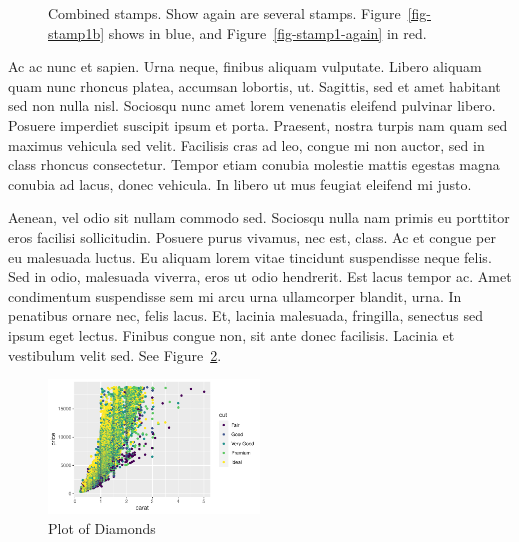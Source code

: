 \documentclass[
  9pt,
  letterpaper,
  DIV=11,
  numbers=noendperiod]{scrartcl}
\begin{document}
\begin{figure}
\begin{minipage}[t]{0.50\linewidth}
{{}

}

\end{minipage}%

\caption{\label{fig-combined}Combined stamps. Show again are several
stamps. Figure~\ref{fig-stamp1b} shows in blue, and
Figure~\ref{fig-stamp1-again} in red.}

\end{figure}

Ac ac nunc et sapien. Urna neque, finibus aliquam vulputate. Libero
aliquam quam nunc rhoncus platea, accumsan lobortis, ut. Sagittis, sed
et amet habitant sed non nulla nisl. Sociosqu nunc amet lorem venenatis
eleifend pulvinar libero. Posuere imperdiet suscipit ipsum et porta.
Praesent, nostra turpis nam quam sed maximus vehicula sed velit.
Facilisis cras ad leo, congue mi non auctor, sed in class rhoncus
consectetur. Tempor etiam conubia molestie mattis egestas magna conubia
ad lacus, donec vehicula. In libero ut mus feugiat eleifend mi justo.

\newpage{}

Aenean, vel odio sit nullam commodo sed. Sociosqu nulla nam primis eu
porttitor eros facilisi sollicitudin. Posuere purus vivamus, nec est,
class. Ac et congue per eu malesuada luctus. Eu aliquam lorem vitae
tincidunt suspendisse neque felis. Sed in odio, malesuada viverra, eros
ut odio hendrerit. Est lacus tempor ac. Amet condimentum suspendisse sem
mi arcu urna ullamcorper blandit, urna. In penatibus ornare nec, felis
lacus. Et, lacinia malesuada, fringilla, senectus sed ipsum eget lectus.
Finibus congue non, sit ante donec facilisis. Lacinia et vestibulum
velit sed. See Figure~\ref{fig-diamonds}.

\begin{figure}

{\centering \includegraphics[width=0.5\textwidth,height=\textheight]{man_files/figure-pdf/fig-diamonds-1.pdf}

}

\caption{\label{fig-diamonds}Plot of Diamonds}

\end{figure}
\end{document}
